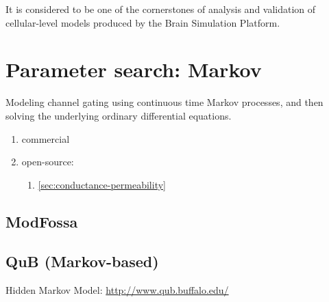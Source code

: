It is considered to be one of the cornerstones of analysis and validation of
cellular-level models produced by the Brain Simulation Platform.


\chapter{Parameter search: Markov}


Modeling channel gating using continuous time Markov processes, and then solving
the underlying ordinary differential equations.
\begin{enumerate}
  \item commercial

  \item open-source:
  \begin{enumerate}
    \item \ref{sec:conductance-permeability}
  \end{enumerate}
\end{enumerate}


\section{ModFossa}
\label{sec:ModFossa}


\section{QuB (Markov-based)}
\label{sec:QuB}

Hidden Markov Model:
\url{http://www.qub.buffalo.edu/}



